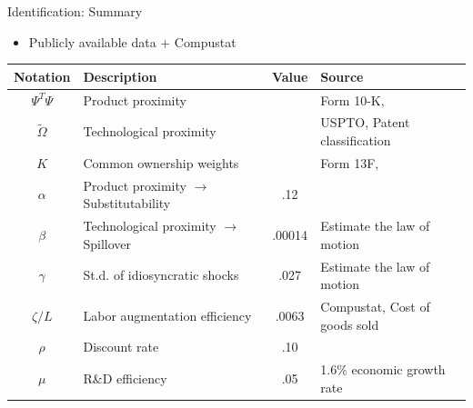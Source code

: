 \documentclass[
  aspectratio=169,  %
  handout           %
]{beamer}
\theoremstyle{plain}
\begin{document}
%
\begin{frame}{Identification: Summary}
  \begin{itemize}
    \item Publicly available data $+$ Compustat
  \end{itemize}
  \begin{center}
    \begin{tabular}{clcl}
      Notation                            & Description                                      & Value  & Source\tabularnewline
      \hline
      $\Psi^{T}\Psi$                      & Product proximity                                &        & Form 10-K, \citet{Hoberg2016-jm}\tabularnewline
      {\footnotesize$\widetilde{\Omega}$} & Technological proximity                          &        & USPTO, Patent classification\tabularnewline
      $K$                                 & Common ownership weights                         &        & Form 13F, \citet{Backus2021-yt}\tabularnewline
      $\alpha$                            & Product proximity $\rightarrow$ Substitutability & .12    & \citet{Pellegrino2024-dn}\tabularnewline
      $\beta$                             & Technological proximity $\rightarrow$ Spillover  & .00014 & Estimate the law of motion\tabularnewline
      $\gamma$                            & St.d. of idiosyncratic shocks                    & .027   & Estimate the law of motion\tabularnewline
      $\zeta/L$                           & Labor augmentation efficiency                    & .0063  & Compustat, Cost of goods sold\tabularnewline
      $\rho$                              & Discount rate                                    & .10    & \tabularnewline
      $\mu$                               & R\&D efficiency                                  & .05    & 1.6\% economic growth rate\tabularnewline
    \end{tabular}
    \par\end{center}

\end{frame}
%
\end{document}
